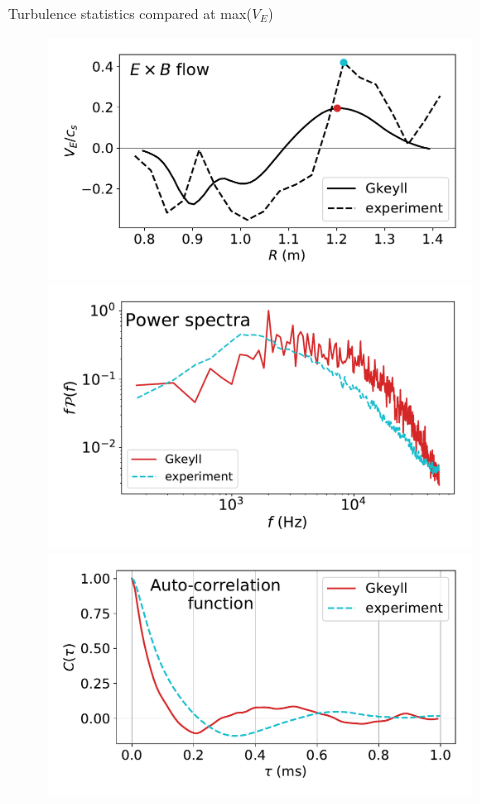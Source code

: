 \documentclass[12pt,table]{beamer}
\begin{document}
\begin{frame}{Turbulence statistics compared at max($V_E$)}
\begin{minipage}{.5\linewidth}
\begin{figure}
    \centering
    \includegraphics[width=.8\linewidth]{figs/ve-sw.pdf} \\
    \vspace{-.2cm}
    \includegraphics[width=.8\linewidth]{figs/fft-ttf.pdf} \\ \vspace{-.2cm}
    \includegraphics[width=.8\linewidth]{figs/autocorr-sw.pdf}
    \label{fig:ve-shear}
\end{figure}
\end{minipage}%

\end{frame}
\end{document}
